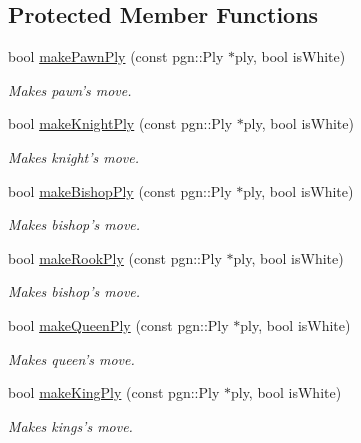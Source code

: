\subsection*{Protected Member Functions}
\begin{DoxyCompactItemize}
\item 
bool \hyperlink{classChEngn_1_1Engine_a5ee94d0b489d05ef5e643cb9cfe5ac1a}{makePawnPly} (const pgn::Ply $\ast$ply, bool isWhite)
\begin{DoxyCompactList}\small\item\em Makes pawn's move. \item\end{DoxyCompactList}\item 
bool \hyperlink{classChEngn_1_1Engine_a1dc6130dd986b0b0b8960a3c1e99f87c}{makeKnightPly} (const pgn::Ply $\ast$ply, bool isWhite)
\begin{DoxyCompactList}\small\item\em Makes knight's move. \item\end{DoxyCompactList}\item 
bool \hyperlink{classChEngn_1_1Engine_a066d78b55f68fe6dbcd6581f64ae512a}{makeBishopPly} (const pgn::Ply $\ast$ply, bool isWhite)
\begin{DoxyCompactList}\small\item\em Makes bishop's move. \item\end{DoxyCompactList}\item 
bool \hyperlink{classChEngn_1_1Engine_aaf471f4ff06fbb4302e214a3c447bf1b}{makeRookPly} (const pgn::Ply $\ast$ply, bool isWhite)
\begin{DoxyCompactList}\small\item\em Makes bishop's move. \item\end{DoxyCompactList}\item 
bool \hyperlink{classChEngn_1_1Engine_a647b1fb60e06af87b271789c11fe9b8f}{makeQueenPly} (const pgn::Ply $\ast$ply, bool isWhite)
\begin{DoxyCompactList}\small\item\em Makes queen's move. \item\end{DoxyCompactList}\item 
bool \hyperlink{classChEngn_1_1Engine_a44d51599b5d1f4a8938938b0d6231e34}{makeKingPly} (const pgn::Ply $\ast$ply, bool isWhite)
\begin{DoxyCompactList}\small\item\em Makes kings's move. \item\end{DoxyCompactList}\item 

\end{DoxyCompactItemize}
